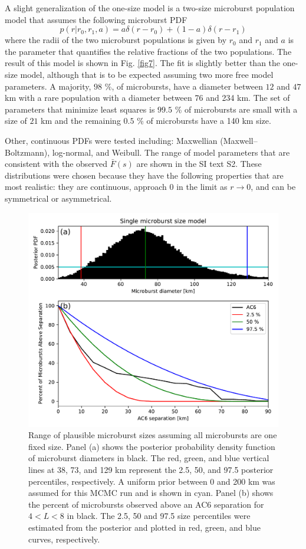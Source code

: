 \documentclass[draft]{agujournal2019}
\begin{document}
A slight generalization of the one-size model is a two-size microburst population model that assumes the following microburst PDF
\begin{equation}
p(r | r_0, r_1, a) = a \delta(r-r_0) + (1-a)\delta(r-r_1)
\end{equation} where the radii of the two microburst populations is given by $r_0$ and $r_1$ and $a$ is the parameter that quantifies the relative fractions of the two populations. The result of this model is shown in Fig. \ref{fig7}. The fit is slightly better than the one-size model, although that is to be expected assuming two more free model parameters. A majority, $98$ \%, of microbursts, have a diameter between $12$ and $47$ km with a rare population with a diameter between 76 and 234 km. The set of parameters that minimize least squares is $99.5$ \% of microbursts are small with a size of $21$ km and the remaining $0.5$ \% of microbursts have a 140 km size.

Other, continuous PDFs were tested including: Maxwellian (Maxwell–Boltzmann), log-normal, and Weibull. The range of model parameters that are consistent with the observed $\bar{F}(s)$ are shown in the SI text S2. These distributions were chosen because they have the following properties that are most realistic: they are continuous, approach 0 in the limit as $r \rightarrow 0$, and can be symmetrical or asymmetrical.

\begin{figure}
\includegraphics[width=\textwidth]{fig6.pdf}
\caption{Range of plausible microburst sizes assuming all microbursts are one fixed size. Panel (a) shows the posterior probability density function of microburst diameters in black. The red, green, and blue vertical lines at 38, 73, and 129 km represent the 2.5, 50, and 97.5 posterior percentiles, respectively. A uniform prior between 0 and 200 km was assumed for this MCMC run and is shown in cyan. Panel (b) shows the percent of microbursts observed above an AC6 separation for $4 < L < 8$ in black. The 2.5, 50 and 97.5 size percentiles were estimated from the posterior and plotted in red, green, and blue curves, respectively.} 
\label{fig6}
\end{figure}
\end{document}
